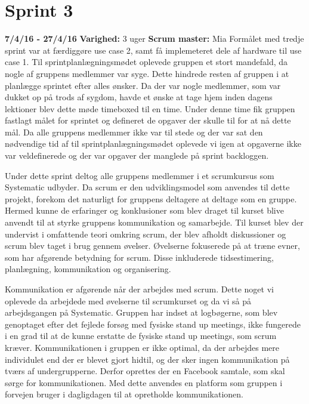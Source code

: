 \documentclass[a4paper,oneside,article]{memoir}
\begin{document}
	\section{Sprint 3}
	\textbf{7/4/16 - 27/4/16}\newline
	\textbf{Varighed: }3 uger \newline
	\textbf{Scrum master: }Mia \newline \newline
	Formålet med tredje sprint var at færdiggøre use case 2, samt få implemeteret dele af hardware til use case 1. Til sprintplanlægningsmødet oplevede gruppen et stort mandefald, da nogle af gruppens medlemmer var syge. Dette hindrede resten af gruppen i at planlægge sprintet efter alles ønsker. Da der var nogle medlemmer, som var dukket op på trods af sygdom, havde et ønske at tage hjem inden dagens lektioner blev dette møde timeboxed til en time. Under denne time fik gruppen fastlagt målet for sprintet og defineret de opgaver der skulle til for at nå dette mål. Da alle gruppens medlemmer ikke var til stede og der var sat den nødvendige tid af til sprintplanlægningsmødet oplevede vi igen at opgaverne ikke var veldefinerede og der var opgaver der manglede på sprint backloggen. \newline
	
	Under dette sprint deltog alle gruppens medlemmer i et scrumkursus som Systematic udbyder. Da scrum er den udviklingsmodel som anvendes til dette projekt, forekom det naturligt for gruppens deltagere at deltage som en gruppe. Hermed kunne de erfaringer og konklusioner som blev draget til kurset blive anvendt til at styrke gruppens kommunikation og samarbejde. 
	Til kurset blev der undervist i omfattende teori omkring scrum, der blev afholdt diskussioner og scrum blev taget i brug gennem øvelser. Øvelserne fokuserede på at træne evner, som har afgørende betydning for scrum. Disse inkluderede tidsestimering, planlægning, kommunikation og organisering. \newline
	
	Kommunikation er afgørende når der arbejdes med scrum. Dette noget vi oplevede da arbejdede med øvelserne til scrumkurset og da vi så på arbejdsgangen på Systematic. Gruppen har indset at logbøgerne, som blev genoptaget efter det fejlede forsøg med fysiske stand up meetings, ikke fungerede i en grad til at de kunne erstatte de fysiske stand up meetings, som scrum kræver. Kommunikationen i gruppen er ikke optimal, da der arbejdes mere individulet end der er blevet gjort hidtil, og der sker ingen kommunikation på tværs af undergrupperne. Derfor oprettes der en Facebook samtale, som skal sørge for kommunikationen. Med dette anvendes en platform som gruppen i forvejen bruger i dagligdagen til at opretholde kommunikationen.  \newline 
	
\end{document}
